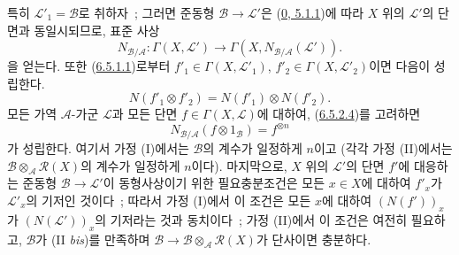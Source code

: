 \begin{env}[6.5.3]
특히 $\mathcal{L}'_1=\mathcal{B}$로 취하자~; 그러면 준동형
$\mathcal{B}\to\mathcal{L}'$은
(\hyperref[0.5.1.1-ko]{0, 5.1.1})에 따라 $X$ 위의 $\mathcal{L}'$의
단면과 동일시되므로, 표준 사상
\[
N_{\mathcal{B}/\mathcal{A}}:\Gamma(X,\mathcal{L}')
\to\Gamma(X,N_{\mathcal{B}/\mathcal{A}}(\mathcal{L}')).
\]
을 얻는다. 또한 (\hyperref[II.6.5.1.1-ko]{6.5.1.1})로부터
$f'_1\in\Gamma(X,\mathcal{L}'_1)$,
$f'_2\in\Gamma(X,\mathcal{L}'_2)$이면 다음이 성립한다.
\[
\label{II.6.5.3.1-ko}
N(f'_1\otimes f'_2)=N(f'_1)\otimes N(f'_2).
\tag{6.5.3.1}
\]
모든 가역 $\mathcal{A}$-가군 $\mathcal{L}$과 모든 단면
$f\in\Gamma(X,\mathcal{L})$에 대하여,
(\hyperref[II.6.5.2.4-ko]{6.5.2.4})를 고려하면
\[
\label{II.6.5.3.2-ko}
N_{\mathcal{B}/\mathcal{A}}(f\otimes1_{\mathcal{B}})=f^{\otimes n}
\tag{6.5.3.2}
\]
가 성립한다. 여기서 가정 (I)에서는 $\mathcal{B}$의 계수가 일정하게
$n$이고 (각각 가정 (II)에서는
$\mathcal{B}\otimes_{\mathcal{A}}\mathcal{R}(X)$의 계수가 일정하게
$n$이다). 마지막으로, $X$ 위의 $\mathcal{L}'$의 단면 $f'$에 대응하는
준동형 $\mathcal{B}\to\mathcal{L}'$이 동형사상이기 위한 필요충분조건은
모든 $x\in X$에 대하여 $f'_x$가 $\mathcal{L}'_x$의 기저인 것이다~;
따라서 가정 (I)에서 이 조건은 모든 $x$에 대하여 $(N(f'))_x$가
$(N(\mathcal{L}'))_x$의 기저라는 것과 동치이다~; 가정 (II)에서 이 조건은
여전히 필요하고, $\mathcal{B}$가 (II \emph{bis})를 만족하며
$\mathcal{B}\to\mathcal{B}\otimes_{\mathcal{A}}\mathcal{R}(X)$가 단사이면
충분하다.
\end{env}

